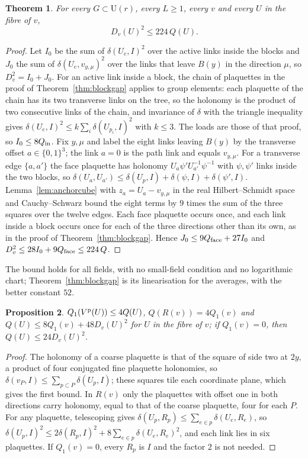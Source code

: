 \documentclass[11pt]{amsart}
\newtheorem{theorem}{Theorem}[section]
\newtheorem{proposition}[theorem]{Proposition}
\theoremstyle{definition}
\theoremstyle{remark}
\numberwithin{equation}{section}
\newcommand{\U}{\mathrm{U}}
\begin{document}
\begin{theorem}\label{thm:pathcoercive}
For every $G\subset\U(r)$, every $L\ge1$, every $v$ and every $U$ in the
fibre of $v$,
\[
D_v(U)^2\le224\,Q(U).
\]
\end{theorem}

\begin{proof}
Let $I_0$ be the sum of $\delta(U_e,I)^2$ over the active links inside the
blocks and $J_0$ the sum of $\delta(U_e,v_{y,\mu})^2$ over the links that
leave $B(y)$ in the direction $\mu$, so $D_v^2=I_0+J_0$. For an active link
inside a block, the chain of plaquettes in the proof of
Theorem~\ref{thm:blockgap} applies to group elements: each plaquette of the
chain has its two transverse links on the tree, so the holonomy is the
product of two consecutive links of the chain, and invariance of $\delta$
with the triangle inequality gives $\delta(U_e,I)^2\le k\sum_i\delta(U_{p_i}
,I)^2$ with $k\le3$. The loads are those of that proof, so $I_0\le8Q_{\rm
in}$. Fix $y,\mu$ and label the eight links leaving $B(y)$ by the
transverse offset $a\in\{0,1\}^3$; the link $a=0$ is the path link and
equals $v_{y,\mu}$. For a transverse edge $\{a,a'\}$ the face plaquette
has holonomy $U_a\psi'U_{a'}^{-1}\psi^{-1}$ with $\psi,\psi'$ links inside
the two blocks, so $\delta(U_a,U_{a'})\le\delta(U_p,I)+\delta(\psi,I)+
\delta(\psi',I)$. Lemma~\ref{lem:anchorcube} with $z_a=U_a-v_{y,\mu}$ in
the real Hilbert--Schmidt space and Cauchy--Schwarz bound the eight terms by
$9$ times the sum of the three squares over the twelve edges. Each face
plaquette occurs once, and each link inside a block occurs once for each of
the three directions other than its own, as in the proof of
Theorem~\ref{thm:blockgap}. Hence $J_0\le9Q_{\rm face}+27I_0$ and
$D_v^2\le28I_0+9Q_{\rm face}\le224\,Q$.
\end{proof}

The bound holds for all fields, with no small-field condition and no
logarithmic chart; Theorem~\ref{thm:blockgap} is its linearisation for the
averages, with the better constant $52$.

\begin{proposition}\label{prop:pathenergy}
$Q_1(V^{\rm p}(U))\le4Q(U)$, $Q(R(v))=4Q_1(v)$ and $Q(U)\le8Q_1(v)+
48D_v(U)^2$ for $U$ in the fibre of $v$; if $Q_1(v)=0$, then $Q(U)\le
24D_v(U)^2$.
\end{proposition}

\begin{proof}
The holonomy of a coarse plaquette is that of the square of side two at
$2y$, a product of four conjugated fine plaquette holonomies, so
$\delta(v_P,I)\le\sum_{p\subset P}\delta(U_p,I)$; these squares tile each
coordinate plane, which gives the first bound. In $R(v)$ only the
plaquettes with offset one in both directions carry holonomy, equal to that
of the coarse plaquette, four for each $P$. For any plaquette,
telescoping gives $\delta(U_p,R_p)\le\sum_{e\in p}\delta(U_e,R_e)$, so
$\delta(U_p,I)^2\le2\delta(R_p,I)^2+8\sum_{e\in p}\delta(U_e,R_e)^2$, and
each link lies in six plaquettes. If $Q_1(v)=0$, every $R_p$ is $I$ and the
factor $2$ is not needed.
\end{proof}
\end{document}
